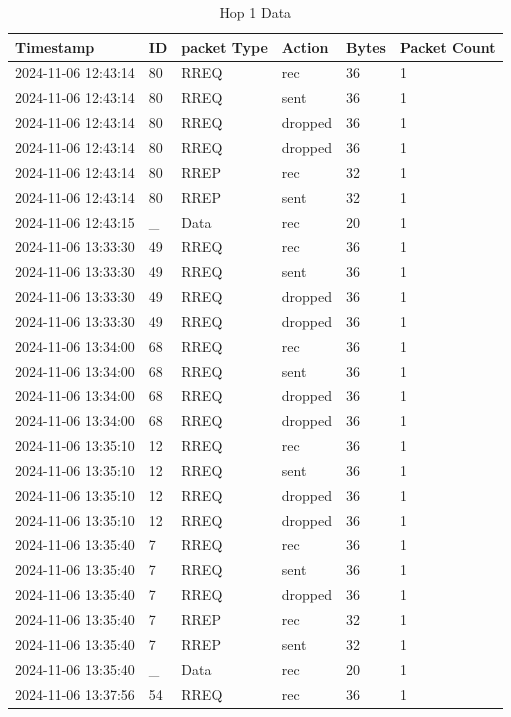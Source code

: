 \documentclass[]{nsm-thesis}
\begin{document}
\begin{longtable}{llllll}
\caption{Hop 1 Data} \label{tab:hop1} \\
\toprule
Timestamp & ID & packet Type & Action & Bytes & Packet Count \\
\midrule
2024-11-06 12:43:14 & 80 & RREQ & rec & 36 & 1 \\
2024-11-06 12:43:14 & 80 & RREQ & sent & 36 & 1 \\
2024-11-06 12:43:14 & 80 & RREQ & dropped & 36 & 1 \\
2024-11-06 12:43:14 & 80 & RREQ & dropped & 36 & 1 \\
2024-11-06 12:43:14 & 80 & RREP & rec & 32 & 1 \\
2024-11-06 12:43:14 & 80 & RREP & sent & 32 & 1 \\
2024-11-06 12:43:15 & _ & Data & rec & 20 & 1 \\
2024-11-06 13:33:30 & 49 & RREQ & rec & 36 & 1 \\
2024-11-06 13:33:30 & 49 & RREQ & sent & 36 & 1 \\
2024-11-06 13:33:30 & 49 & RREQ & dropped & 36 & 1 \\
2024-11-06 13:33:30 & 49 & RREQ & dropped & 36 & 1 \\
2024-11-06 13:34:00 & 68 & RREQ & rec & 36 & 1 \\
2024-11-06 13:34:00 & 68 & RREQ & sent & 36 & 1 \\
2024-11-06 13:34:00 & 68 & RREQ & dropped & 36 & 1 \\
2024-11-06 13:34:00 & 68 & RREQ & dropped & 36 & 1 \\
2024-11-06 13:35:10 & 12 & RREQ & rec & 36 & 1 \\
2024-11-06 13:35:10 & 12 & RREQ & sent & 36 & 1 \\
2024-11-06 13:35:10 & 12 & RREQ & dropped & 36 & 1 \\
2024-11-06 13:35:10 & 12 & RREQ & dropped & 36 & 1 \\
2024-11-06 13:35:40 & 7 & RREQ & rec & 36 & 1 \\
2024-11-06 13:35:40 & 7 & RREQ & sent & 36 & 1 \\
2024-11-06 13:35:40 & 7 & RREQ & dropped & 36 & 1 \\
2024-11-06 13:35:40 & 7 & RREP & rec & 32 & 1 \\
2024-11-06 13:35:40 & 7 & RREP & sent & 32 & 1 \\
2024-11-06 13:35:40 & _ & Data & rec & 20 & 1 \\
2024-11-06 13:37:56 & 54 & RREQ & rec & 36 & 1 \\

\end{longtable}
\end{document}
